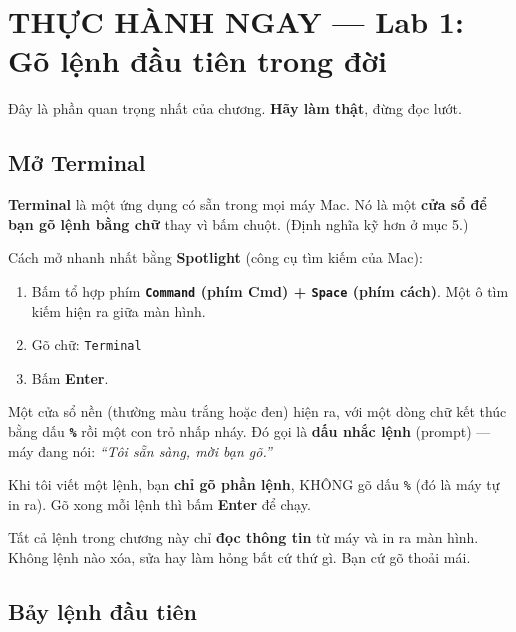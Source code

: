 \documentclass[12pt,a4paper]{article}
\begin{document}
\section{THỰC HÀNH NGAY — Lab 1: Gõ lệnh đầu tiên trong đời}

Đây là phần quan trọng nhất của chương. \textbf{Hãy làm thật}, đừng đọc lướt.

\subsection{Mở Terminal}

\textbf{Terminal} là một ứng dụng có sẵn trong mọi máy Mac. Nó là một \textbf{cửa sổ để bạn gõ lệnh bằng chữ} thay vì bấm chuột. (Định nghĩa kỹ hơn ở mục 5.)

Cách mở nhanh nhất bằng \textbf{Spotlight} (công cụ tìm kiếm của Mac):

\begin{enumerate}[leftmargin=*]
  \item Bấm tổ hợp phím \textbf{\texttt{Command} (phím \textbf{Cmd}) + \texttt{Space} (phím cách)}. Một ô tìm kiếm hiện ra giữa màn hình.
  \item Gõ chữ: \texttt{Terminal}
  \item Bấm \textbf{Enter}.
\end{enumerate}

Một cửa sổ nền (thường màu trắng hoặc đen) hiện ra, với một dòng chữ kết thúc bằng dấu \textbf{\texttt{\%}} rồi một con trỏ nhấp nháy. Đó gọi là \textbf{dấu nhắc lệnh} (prompt) — máy đang nói: \textit{``Tôi sẵn sàng, mời bạn gõ.''}

\begin{notebox}
Khi tôi viết một lệnh, bạn \textbf{chỉ gõ phần lệnh}, KHÔNG gõ dấu \texttt{\%} (đó là máy tự in ra). Gõ xong mỗi lệnh thì bấm \textbf{Enter} để chạy.
\end{notebox}

\begin{tipbox}
Tất cả lệnh trong chương này chỉ \textbf{đọc thông tin} từ máy và in ra màn hình. Không lệnh nào xóa, sửa hay làm hỏng bất cứ thứ gì. Bạn cứ gõ thoải mái.
\end{tipbox}

\subsection{Bảy lệnh đầu tiên}
\end{document}
